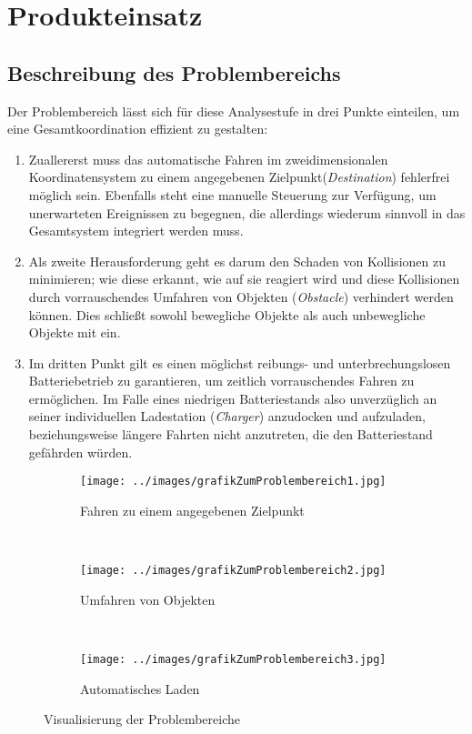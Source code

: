 
	\section{Produkteinsatz}

		\subsection{Beschreibung des Problembereichs}
		Der Problembereich lässt sich für diese Analysestufe in drei Punkte einteilen, um eine Gesamtkoordination effizient zu gestalten:

		\begin{enumerate}
		\item
			Zuallererst muss das automatische Fahren im zweidimensionalen
			Koordinatensystem zu einem angegebenen Zielpunkt(\emph{Destination})
			fehlerfrei möglich sein. Ebenfalls steht eine manuelle Steuerung zur
			Verfügung, um unerwarteten Ereignissen zu begegnen, die allerdings
			wiederum sinnvoll in das Gesamtsystem integriert werden muss.
		\item
			Als zweite Herausforderung geht es darum den Schaden von Kollisionen
			zu minimieren; wie diese erkannt, wie auf sie reagiert wird und diese
			Kollisionen durch vorrauschendes Umfahren von
			Objekten (\emph{Obstacle}) verhindert werden können. Dies schließt
			sowohl bewegliche Objekte als auch unbewegliche Objekte mit ein.
		\item
			Im dritten Punkt gilt es einen möglichst reibungs- und
			unterbrechungslosen Batteriebetrieb zu garantieren, um zeitlich
			vorrauschendes Fahren zu ermöglichen. Im Falle eines niedrigen
			Batteriestands also unverzüglich an seiner individuellen Ladestation
			(\emph{Charger}) anzudocken und aufzuladen, beziehungsweise längere
			Fahrten nicht anzutreten, die den Batteriestand gefährden würden.
		\end{enumerate}

		\begin{figure}[H]
			\centering
			\begin{subfigure}[t]{0.3\textwidth}
				\texttt{[image: ../images/grafikZumProblembereich1.jpg]}
				\caption{Fahren zu einem angegebenen Zielpunkt}
				\label{fig:2-1-problembereich-1}
			\end{subfigure}
			~~~~
			\begin{subfigure}[t]{0.3\textwidth}
				\texttt{[image: ../images/grafikZumProblembereich2.jpg]}
				\caption{Umfahren von Objekten}
				\label{fig:2-1-problembereich-2}
			\end{subfigure}
			~~~~
			\begin{subfigure}[t]{0.3\textwidth}
				\texttt{[image: ../images/grafikZumProblembereich3.jpg]}
				\caption{Automatisches Laden}
				\label{fig:2-1-problembereich-3}
			\end{subfigure}
			\caption{Visualisierung der Problembereiche}\label{fig:2-1-problembereiche}
		\end{figure}

